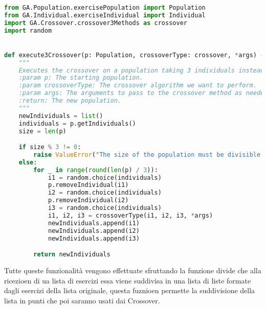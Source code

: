 \documentclass{article}
\begin{document}
\begin{lstlisting}[language=Python, breaklines, no caption]
from GA.Population.exercisePopulation import Population
from GA.Individual.exerciseIndividual import Individual
import GA.Crossover.crossover3Methods as crossover
import random


def execute3Crossover(p: Population, crossoverType: crossover, *args) -> list[Individual]:
    """
    Executes the crossover on a population taking 3 individuals instead of 2.
    :param p: The starting population.
    :param crossoverType: The crossover algorithm we want to perform.
    :param args: The arguments to pass to the crossover method as needed.
    :return: The new population.
    """
    newIndividuals = list()
    individuals = p.getIndividuals()
    size = len(p)

    if size % 3 != 0:
        raise ValueError("The size of the population must be divisible by 3!")
    else:
        for _ in range(round(len(p) / 3)):
            i1 = random.choice(individuals)
            p.removeIndividual(i1)
            i2 = random.choice(individuals)
            p.removeIndividual(i2)
            i3 = random.choice(individuals)
            i1, i2, i3 = crossoverType(i1, i2, i3, *args)
            newIndividuals.append(i1)
            newIndividuals.append(i2)
            newIndividuals.append(i3)

        return newIndividuals
\end{lstlisting}
    Tutte queste funzionalità vengono effettuate sfruttando la funzione divide che alla ricezioen di ua lista di esercizi essa viene suddivisa in una lista di liste formate dagli esercizi della lista originale, questa fuznioen permette la suddivisione della lista in punti che poi saranno usati dai Crossover.
\end{document}
